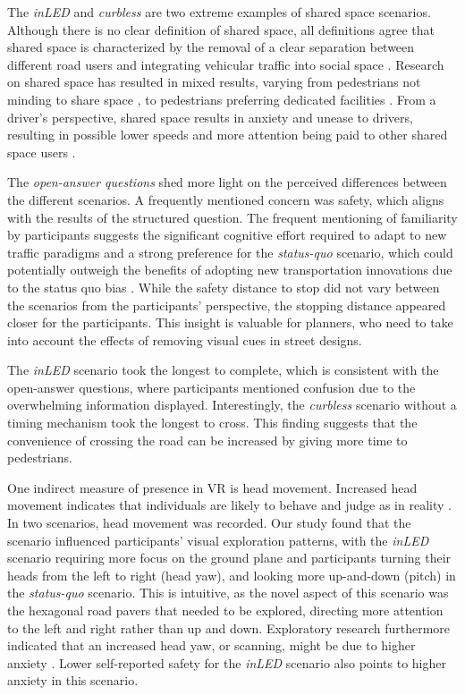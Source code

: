 The \emph{inLED} and \emph{curbless} are two extreme examples of shared space scenarios. Although there is no clear definition of shared space, all definitions agree that shared space is characterized by the removal of a clear separation between different road users \cite{KarndacharukTransRev2014} and integrating vehicular traffic into social space \cite{HamiltonBaillieEnv2008}. Research on shared space has resulted in mixed results, varying from pedestrians not minding to share space \cite{Hammond2013}, to pedestrians preferring dedicated facilities \cite{KapariasTranResF2012}. From a driver's perspective, shared space results in anxiety and unease to drivers, resulting in possible lower speeds and more attention being paid to other shared space users \cite{Moody2014}. 

The \emph{open-answer questions} shed more light on the perceived differences between the different scenarios. A frequently mentioned concern was safety, which aligns with the results of the structured question. The frequent mentioning of familiarity by participants suggests the significant cognitive effort required to adapt to new traffic paradigms and a strong preference for the \emph{status-quo} scenario, which could potentially outweigh the benefits of adopting new transportation innovations due to the status quo bias \cite{samuelson1988status}. While the safety distance to stop did not vary between the scenarios from the participants' perspective, the stopping distance appeared closer for the participants. This insight is valuable for planners, who need to take into account the effects of removing visual cues in street designs.

The \emph{inLED} scenario took the longest to complete, which is consistent with the open-answer questions, where participants mentioned confusion due to the overwhelming information displayed. 
Interestingly, the \emph{curbless} scenario without a timing mechanism took the longest to cross. This finding suggests that the convenience of crossing the road can be increased by giving more time to pedestrians. 

One indirect measure of presence in VR is head movement. Increased head movement indicates that individuals are likely to behave and judge as in reality \cite{Slater1998}. In two scenarios, head movement was recorded. Our study found that the scenario influenced participants' visual exploration patterns, with the \emph{inLED} scenario requiring more focus on the ground plane and participants turning their heads from the left to right (head yaw), and looking more up-and-down (pitch) in the \emph{status-quo} scenario. 
This is intuitive, as the novel aspect of this scenario was the hexagonal road pavers that needed to be explored, directing more attention to the left and right rather than up and down. 
Exploratory research furthermore indicated that an increased head yaw, or scanning, might be due to higher anxiety \cite{WonCyber2016}. Lower self-reported safety for the \emph{inLED} scenario also points to higher anxiety in this scenario. 

